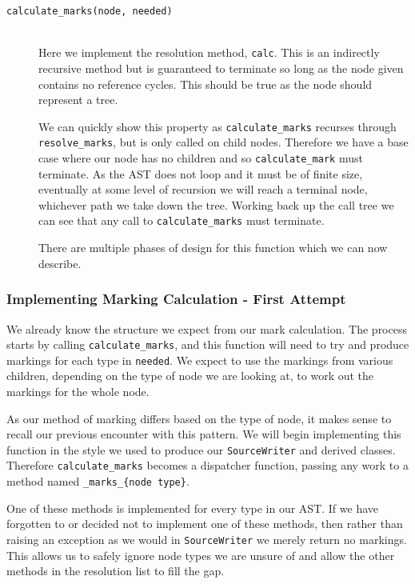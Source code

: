 \documentclass[twoside,a4paper]{report}
\begin{document}
\begin{description}
\item[\texttt{calculate\_marks(node, needed)}] \hfill \\
Here we implement the resolution method, \texttt{calc}. This is an indirectly recursive method but is guaranteed to terminate so long as the node
given contains no reference cycles. This should be true as the node should represent a tree.

We can quickly show this property as \texttt{calculate\_marks} recurses through \texttt{resolve\_marks}, but is only called on child nodes. Therefore we have
a base case where our node has no children and so \texttt{calculate\_mark} must terminate. As the AST does not loop and it must be of finite size,
eventually at some level of recursion we will reach a terminal node, whichever path we take down the tree. Working back up the call tree we can see
that any call to \texttt{calculate\_marks} must terminate.

There are multiple phases of design for this function which we can now describe.
\end{description}

\subsubsection{Implementing Marking Calculation - First Attempt}

We already know the structure we expect from our mark calculation. The process starts by calling \texttt{calculate\_marks}, and this function will
need to try and produce markings for each type in \texttt{needed}. We expect to use the markings from various children, depending on the
type of node we are looking at, to work out the markings for the whole node.

As our method of marking differs based on the type of node, it makes sense to recall our previous encounter with this pattern. We will begin
implementing this function in the style we used to produce our \texttt{SourceWriter} and derived classes. Therefore \texttt{calculate\_marks} becomes
a dispatcher function, passing any work to a method named \texttt{\_marks\_\{node type\}}.

One of these methods is implemented for every type in our AST. If we have forgotten to or decided not to implement one of these methods, then rather than raising
an exception as we would in \texttt{SourceWriter} we merely return no markings. This allows us to safely ignore node types we are unsure of and allow
the other methods in the resolution list to fill the gap.
\end{document}
